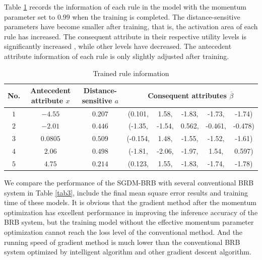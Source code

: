 \documentclass{ieeeaccess}
\begin{document}
Table \ref{tab2} records the information of each rule in the model with the momentum parameter set to $0.99$ when the training is completed.
The distance-sensitive parameters have become smaller after training, that is, the activation area of each rule has increased.
The consequent attribute in their respective utility levels is significantly increased , while other levels have decreased.
The antecedent attribute information of each rule is only slightly adjusted after training.

\begin{table}
    \caption{Trained rule information}
    \centering
    \normalsize
    \label{tab2}
    \begin{tabular}{cccccccc}
        \hline
        No. & Antecedent attribute $x$ & Distance-sensitive $a$ & \multicolumn{5}{c}{Consequent attributes $\overline{\beta}$}                                       \\
        \hline
        $1$ & $-4.55$                  & $0.207$                & (0.101,                                                      & 1.58,  & -1.83, & -1.73,  & -1.74)  \\
        $2$ & $-2.01$                  & $0.446$                & (-1.35,                                                      & -1.54, & 0.562, & -0.461, & -0.478) \\
        $3$ & $0.0805$                 & $0.509$                & (-0.154,                                                     & 1.48,  & -1.55, & -1.52,  & -1.61)  \\
        $4$ & $2.06$                   & $0.498$                & (-1.81,                                                      & -2.06, & -1.97, & 1.54,   & 0.597)  \\
        $5$ & $4.75$                   & $0.214$                & (0.123,                                                      & 1.55,  & -1.83, & -1.74,  & -1.78)  \\
        \hline
    \end{tabular}
\end{table}

We compare the performance of the SGDM-BRB with several conventional BRB system in Table \ref{tab3},
include the final mean square error results and training time of these models.
It is obvious that the gradient method after the momentum optimization has excellent performance in improving the inference accuracy of the BRB system,
but the training model without the effective momentum parameter optimization cannot reach the loss level of the conventional method.
And the running speed of gradient method is much lower than the conventional BRB system optimized by intelligent algorithm and other gradient descent algorithm.
\end{document}

